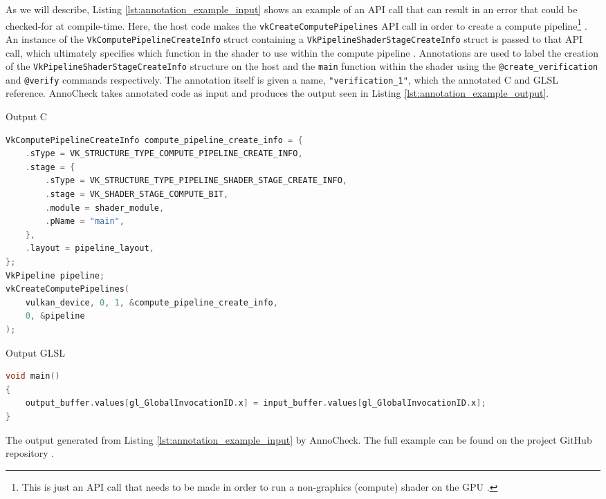 \documentclass[a4paper,12pt,twoside,openright]{report}
\begin{document}
As we will describe, Listing \ref{lst:annotation_example_input} shows an
example of an API call that can result in an error that could be checked-for at
compile-time. Here, the host code makes the \texttt{vkCreateComputePipelines}
API call in order to create a compute pipeline\footnote{This is just an API
call that needs to be made in order to run a non-graphics (compute) shader on
the GPU \cite{vkCreateComputePipelines}.} \cite{vkCreateComputePipelines}. An
instance of the \texttt{VkComputePipelineCreateInfo} struct containing a
\texttt{VkPipelineShaderStageCreateInfo} struct is passed to that API call,
which ultimately specifies which function in the shader to use within the
compute pipeline \cite{VkComputePipelineCreateInfo}
\cite{VkPipelineShaderStageCreateInfo}. Annotations are used to label the
creation of the \texttt{VkPipelineShaderStageCreateInfo} structure on the host
and the \texttt{main} function within the shader using the
\texttt{@create\_verification} and \texttt{@verify} commands respectively. The
annotation itself is given a name, \texttt{"verification\_1"}, which the
annotated C and GLSL reference. AnnoCheck takes annotated code as input and
produces the output seen in Listing \ref{lst:annotation_example_output}.

\begin{lstfloat}
\begin{center} Output C \end{center}
\begin{lstlisting}[language=C]
VkComputePipelineCreateInfo compute_pipeline_create_info = {
    .sType = VK_STRUCTURE_TYPE_COMPUTE_PIPELINE_CREATE_INFO,
    .stage = {
        .sType = VK_STRUCTURE_TYPE_PIPELINE_SHADER_STAGE_CREATE_INFO,
        .stage = VK_SHADER_STAGE_COMPUTE_BIT,
        .module = shader_module,
        .pName = "main",
    },
    .layout = pipeline_layout,
};
VkPipeline pipeline;
vkCreateComputePipelines(
    vulkan_device, 0, 1, &compute_pipeline_create_info,
    0, &pipeline
);
\end{lstlisting}
\begin{center} Output GLSL \end{center}
\begin{lstlisting}[language=C]
void main()
{
    output_buffer.values[gl_GlobalInvocationID.x] = input_buffer.values[gl_GlobalInvocationID.x];
}
\end{lstlisting}
\caption{The output generated from Listing \ref{lst:annotation_example_input}
by AnnoCheck. The full example can be found on the project GitHub repository
\cite{ProjectSource}.}
\label{lst:annotation_example_output}
\end{lstfloat}
\end{document}
